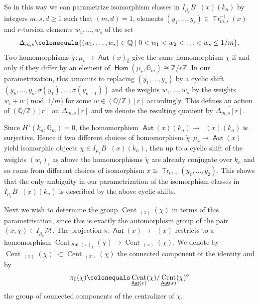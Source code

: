 \documentclass{article}
\DeclareMathOperator{\Hom}{\mathsf{Hom}}
\DeclareMathOperator{\Aut}{\mathsf{Aut}}
\DeclareMathOperator{\uAut}{\underline{\mathsf{Aut}}}
\DeclareMathOperator{\Tr}{\mathsf{Tr}}
\newcommand{\BG}{{\mathbb{G}}}
\newcommand{\BQ}{{\mathbb{Q}}}
\newcommand{\BZ}{{\mathbb{Z}}}
\newcommand{\CM}{{\mathcal M}}
\DeclareMathOperator{\Cent}{Cent}
\newcommand{\defeq}{\colonequals}
\theoremstyle{definition}
\theoremstyle{plain}
\begin{document}
So in this way we can parametrize isomorphism classes in  $I_{\mu_r}B\uAut(x)(k_n)$ by integers $m,s,d \geq 1$ such that $(m,d)=1$, elements $(y_1,\hdots,y_s) \in \Tr^{-1}_{m,s}(x)$ and $r$-torsion elements $w_1,\hdots, w_s$ of the set
\begin{equation*}
    \Delta_{m,s}\defeq \{(w_1,\hdots,w_s) \in \BQ \mid 0< w_1 < w_2 < \hdots < w_s \leq 1/m\}.
\end{equation*}
Two homomorphisms $\tilde \chi\colon \mu_r \to \Aut(x)_{\bar k}$ give the same homomorphism $\chi$ if and only if they differ by an element of $\Hom(\mu_r, \BG_m) \cong \BZ/r \BZ$. In our parametrization, this amounts to replacing $(y_1,\hdots,y_s)$ by a cyclic shift $(y_k,\hdots, y_s, \sigma(y_1), \hdots, \sigma(y_{k-1}))$ and the weights $w_1,\hdots,w_s$ by the weights $w_i+w \pmod{ 1/m}$ for some $w \in (\BQ/\BZ)[r]$ accordingly. This defines an action of $(\BQ/\BZ)[r]$ on $\Delta_{m,s}[r]$ and we denote the resulting quotient by $\overline{\Delta_{m,s}[r]}$.

Since $H^1(k_n,\BG_m)=0$, the homomorphism $\Aut(x)(k_n) \to \uAut(x)(k_n)$ is surjective. Hence if two different choices of homomorphism $\tilde\chi\colon \mu_r \to \Aut(x)$ yield isomorphic objects $\chi \in I_{\mu_r}B\uAut(x)(k_n)$, then up to a cyclic shift of the weights $(w_i)_i$ as above the homomorphisms $\tilde \chi$ are already conjugate over $k_n$ and so come from different choices of isomorphism $x\cong \Tr_{m,s}(y_1,\hdots,y_2)$. This shows that the only ambiguity in our parametrization of the isomorphism classes in $I_{\mu_r}B\uAut(x)(k_n)$ is described by the above cyclic shifts.

    Next we wish to determine the group $\Cent_{\uAut(x)}(\chi)$ in terms of this parametrisation, since this is exactly the automorphism group of the pair $(x,\chi)\in I_{\mu_r}\CM$. The projection $\pi\colon \Aut(x) \to \uAut(x)$ restricts to a homomorphism $\Cent_{\Aut(x)_{\bar k}}(\tilde \chi) \to \Cent_{\uAut(x)}(\chi)$. We denote by $\Cent_{\uAut(x)}(\chi)^\circ \subset \Cent_{\uAut(x)}(\chi)$ the connected component of the identity and by $$\pi_0(\chi) \defeq \Cent_{\uAut(x)}(\chi)/\Cent_{\uAut(x)}(\chi)^\circ$$ the group of connected components of the centralizer of $\chi$.
\end{document}

